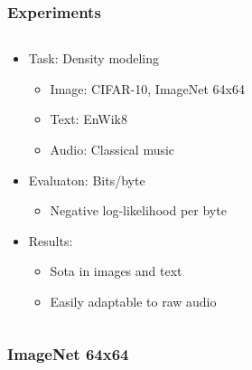 \documentclass[dvipdfmx]{beamer}
\begin{document}
\begin{frame}
    \frametitle{Experiments}
    \begin{columns}
        \begin{column}[T]{0.575\textwidth}
            \begin{itemize}
                \item Task: Density modeling
                \begin{itemize}
                    \item Image: CIFAR-10, ImageNet 64x64
                    \item Text: EnWik8
                    \item Audio: Classical music
                \end{itemize}
            \end{itemize}
            \begin{itemize}
                \item Evaluaton: Bits/byte
                \begin{itemize}
                    \item Negative log-likelihood per byte
                \end{itemize}
            \end{itemize}
            \begin{itemize}
                \item Results:
                \begin{itemize}
                    \item Sota in images and text
                    \item Easily adaptable to raw audio
                \end{itemize}
            \end{itemize}
        \end{column}
        \begin{column}[T]{0.425\textwidth}
        \end{column}
    \end{columns}
\end{frame}


\begin{frame}
    \frametitle{ImageNet 64x64}
\end{frame}
\end{document}
